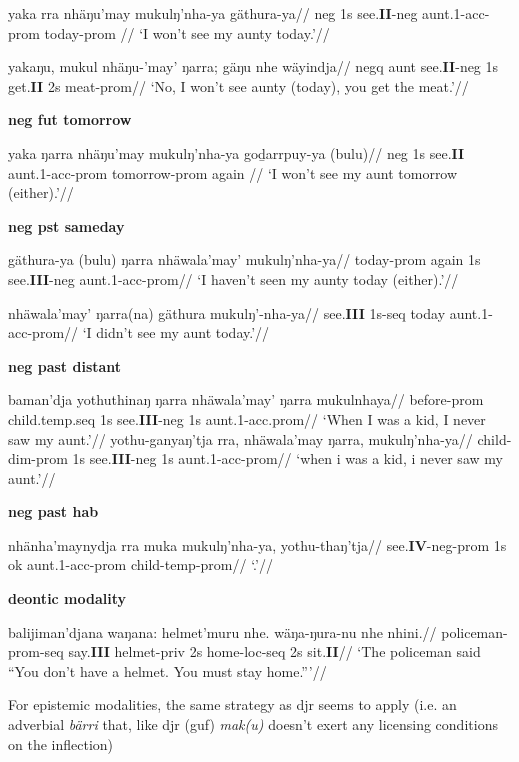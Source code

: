 \a\begingl\gla  yaka rra nhäŋu'may mukulŋ'nha-ya gäthura-ya//
\glb \gls{neg} 1s see.\textbf{II}-\gls{neg} aunt.1-\gls{acc}-\gls{prom} today-\gls{prom} //
\glft`I won't see my aunty today.'\trailingcitation{[RN~20190520~3min3s]}//\endgl

\a\begingl\gla  yakaŋu, mukul nhäŋu-'may' ŋarra; gäŋu nhe wäyindja//
\glb\gls{negq} aunt see.\textbf{II}-\gls{neg} 1s get.\textbf{II} 2s meat-\gls{prom}//
\glft`No, I won't see aunty (today), you get the meat.'\trailingcitation{[DW~20190522~12min45s]}//\endgl

\xe


\pex\textbf{neg fut tomorrow}

\a\begingl\gla  yaka ŋarra nhäŋu'may mukulŋ'nha-ya goḏarrpuy-ya (bulu)//
\glb \gls{neg} 1s see.\textbf{II} aunt.1-\gls{acc}-\gls{prom} tomorrow-\gls{prom} again //
\glft`I won't see my aunt tomorrow (either).'\trailingcitation{[RN~20190520~3min12s]}//\endgl\xe


\pex\textbf{neg pst sameday}

\a\begingl\gla  gäthura-ya (bulu) ŋarra nhäwala'may' mukulŋ'nha-ya//
\glb today-\gls{prom} again 1s see.\textbf{III}-\gls{neg} aunt.1-\gls{acc}-\gls{prom}//
\glft`I haven't seen my aunty today (either).'\trailingcitation{[RN~20190520]}//\endgl

\a\begingl\gla nhäwala'may' ŋarra(na) gäthura mukulŋ'-nha-ya//
\glb see.\textbf{III} 1s-\gls{seq} today aunt.1-\gls{acc}-\gls{prom}//
\glft`I  didn't see my aunt today.'\trailingcitation{[AL~20190522~14min18s]}//\endgl
\xe

\pex\textbf{neg past distant}

\a\begingl\gla baman'dja yothuthinaŋ ŋarra nhäwala'may' ŋarra mukulnhaya//
\glb before-\gls{prom} child.\gls{temp}.\gls{seq} 1s see.\textbf{III}-\gls{neg} 1s aunt.1-\gls{acc}.\gls{prom}//
\glft`When I was a kid, I never saw my aunt.'//\endgl
\a\begingl\gla yothu-ganyaŋ'tja rra, nhäwala'may ŋarra, mukulŋ'nha-ya//
\glb child-\gls{dim}-\gls{prom} 1s see.\textbf{III}-\gls{neg} 1s aunt.1-\gls{acc}-\gls{prom}//
\glft`when i was a kid, i never saw my aunt.'\trailingcitation{[RN~20190520]}//\endgl
\xe

\pex\textbf{neg past hab}

\a\begingl\gla nhänha'maynydja rra muka mukulŋ'nha-ya, yothu-thaŋ'tja//
\glb see.\textbf{IV}-\gls{neg}-\gls{prom} 1s ok aunt.1-\gls{acc}-\gls{prom} child-\gls{temp}-\gls{prom}//
\glft`.'\trailingcitation{[RN~20190520]}//\endgl\xe

\pex\textbf{deontic modality}

\a\begingl\gla balijiman'djana waŋana: helmet'muru nhe. wäŋa-ŋura-nu nhe nhini.//
\glb policeman-\gls{prom}-\gls{seq} say.\textbf{III} helmet-\gls{priv} 2s home-\gls{loc}-\gls{seq} 2s sit.\textbf{II}//
\glft`The policeman said ``You don't have a helmet. You must stay home.'''\trailingcitation{[DW~20190522~36min15]}//\endgl\xe

For epistemic modalities, the same strategy as djr seems to apply (i.e. an adverbial \textit{bärri} that, like djr (guf) \textit{mak(u)} doesn't exert any licensing conditions on the inflection)